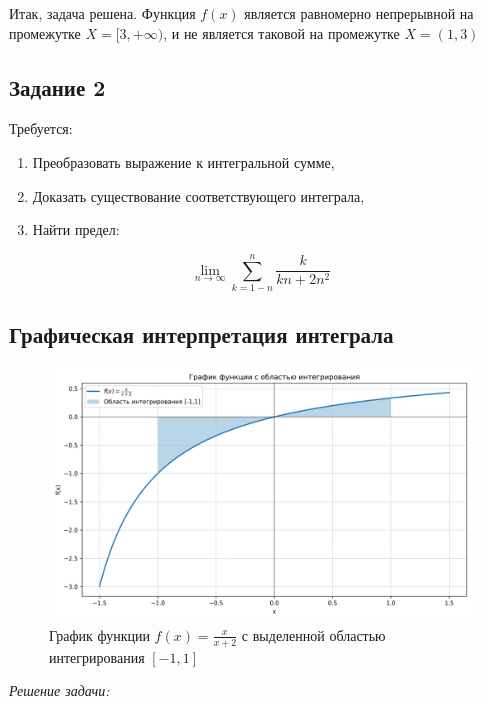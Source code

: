 \documentclass[a4paper,12pt]{article}
\begin{document}
Итак, задача решена. Функция \( f(x) \) является равномерно непрерывной на промежутке \(X = [3,+\infty)\), и не является таковой на промежутке \( X = (1,3) \)


\newpage
\subsection{Задание 2}

Требуется:
\begin{enumerate}
    \item Преобразовать выражение к интегральной сумме,
    \item Доказать существование соответствующего интеграла,
    \item Найти предел:
\end{enumerate}

\[
\lim_{n \to \infty} \sum_{k=1 - n}^{n} \frac{k}{kn + 2n^2}
\]

\subsection*{Графическая интерпретация интеграла}

\begin{figure}[H]
    \centering
    \includegraphics[width=0.9\linewidth]{img/integral_plot.png}
    \caption{График функции $f(x) = \frac{x}{x+2}$ с выделенной областью интегрирования $[-1,1]$}
    \label{fig:integral}
\end{figure}

\emph{Решение задачи:}
\end{document}
